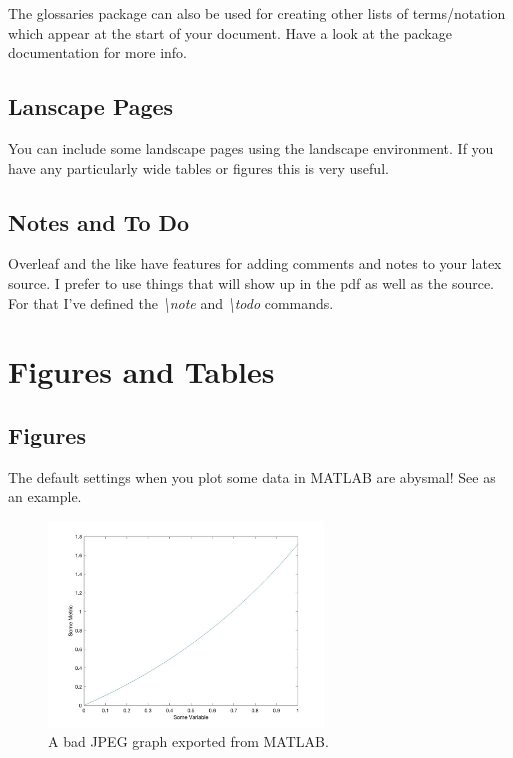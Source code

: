 \documentclass{BCUDissertation}
\begin{document}
\begin{appendices}
        The glossaries package can also be used for creating other lists of terms/notation which appear at the start of your document. Have a look at the package documentation for more info.

    \begin{landscape}
    \subsection{Lanscape Pages}
        You can include some landscape pages using the landscape environment. If you have any particularly wide tables or figures this is very useful.
        \end{landscape}

    \subsection{Notes and To Do}
        Overleaf and the like have features for adding comments and notes to your latex source. I prefer to use things that will show up in the pdf as well as the source. For that I've defined the \textit{\textbackslash note} and \textit{\textbackslash todo} commands.
    
        
            
\section{Figures and Tables}
\label{sec:FiguresAndTables}

    \subsection{Figures}
    \label{sec:Figures}

        The default settings when you plot some data in MATLAB are abysmal! See  as an example.
    
        \begin{figure}[ht!]
            \centering
            \includegraphics[width=0.65\textwidth]{Images/a_graph.jpg}
            \caption{A bad JPEG graph exported from MATLAB.}
            \label{fig:BadGraph}
        \end{figure}
    

\end{appendices}
\end{document}
